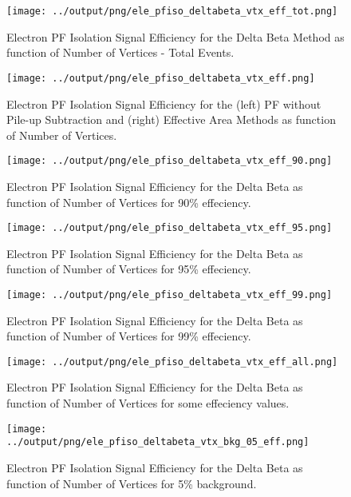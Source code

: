 \documentclass[11pt]{book}
\begin{document}
\begin{figure}[htb]
\centering
\texttt{[image: ../output/png/ele\_pfiso\_deltabeta\_vtx\_eff\_tot.png]}
\caption{Electron PF Isolation Signal Efficiency for the Delta Beta Method as function of Number of Vertices - Total Events.}
\label{fig:ele_pfiso_vtx_eff_deltabeta_tot}
\end{figure}

\begin{figure}[htb]
\centering
\texttt{[image: ../output/png/ele\_pfiso\_deltabeta\_vtx\_eff.png]}
\caption{Electron PF Isolation Signal Efficiency for the (left) PF without Pile-up Subtraction and (right) Effective Area Methods as function of Number of Vertices.}
\label{fig:ele_pfiso_vtx_eff_deltabeta}
\end{figure}

\begin{figure}[htb]
\centering
\texttt{[image: ../output/png/ele\_pfiso\_deltabeta\_vtx\_eff\_90.png]}
\caption{Electron PF Isolation Signal Efficiency for the Delta Beta as function of Number of Vertices for 90\% effeciency.}
\label{fig:ele_pfiso_vtx_eff_deltabeta_eff_90}
\end{figure}

\begin{figure}[htb]
\centering
\texttt{[image: ../output/png/ele\_pfiso\_deltabeta\_vtx\_eff\_95.png]}
\caption{Electron PF Isolation Signal Efficiency for the Delta Beta as function of Number of Vertices for 95\% effeciency.}
\label{fig:ele_pfiso_vtx_eff_deltabeta_eff_95}
\end{figure}

\begin{figure}[htb]
\centering
\texttt{[image: ../output/png/ele\_pfiso\_deltabeta\_vtx\_eff\_99.png]}
\caption{Electron PF Isolation Signal Efficiency for the Delta Beta as function of Number of Vertices for 99\% effeciency.}
\label{fig:ele_pfiso_vtx_eff_deltabeta_eff_99}
\end{figure}

\begin{figure}[htb]
\centering
\texttt{[image: ../output/png/ele\_pfiso\_deltabeta\_vtx\_eff\_all.png]}
\caption{Electron PF Isolation Signal Efficiency for the Delta Beta as function of Number of Vertices for some effeciency values.}
\label{fig:ele_pfiso_vtx_eff_deltabeta_eff_all}
\end{figure}

\begin{figure}[htb]
\centering
\texttt{[image: ../output/png/ele\_pfiso\_deltabeta\_vtx\_bkg\_05\_eff.png]}
\caption{Electron PF Isolation Signal Efficiency for the Delta Beta as function of Number of Vertices for 5\% background.}
\label{fig:ele_pfiso_vtx_eff_deltabeta_bkg_05_eff}
\end{figure}
\end{document}
